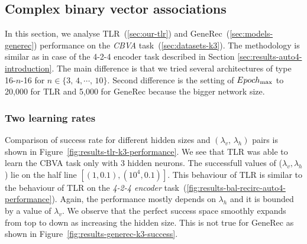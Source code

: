 

\subsection{Complex binary vector associations} 
\label{sec:results-k3}

In this section, we analyse TLR~(\ref{sec:our-tlr}) and GeneRec~(\ref{sec:models-generec}) performance on the \emph{CBVA} task~(\ref{sec:datasets-k3}). The methodology is similar as in case of the 4-2-4 encoder task described in Section \ref{sec:results-auto4-introduction}. The main difference is that we tried several architectures of type 16-$n$-16 for $n \in \{3,\,4,\cdots,\,10\}$. Second difference is the setting of $Epoch_{\rm max}$ to 20,000 for TLR and 5,000 for GeneRec because the bigger network size. 

\subsubsection{Two learning rates} 
\label{sec:tlr-k3}

Comparison of success rate for different hidden sizes and $(\lambda_v,\,\lambda_h)$ pairs is shown in Figure~\ref{fig:results-tlr-k3-performance}. We see that TLR was able to learn the CBVA task only with 3 hidden neurons. The successfull values of ($\lambda_v, \lambda_h$) lie on the half line $[(1, 0.1), (10^4, 0.1)]$. This behaviour of TLR is similar to the behaviour of TLR on the \emph{4-2-4 encoder} task~(\ref{fig:results-bal-recirc-auto4-performance}). Again, the performance mostly depends on $\lambda_h$ and it is bounded by a value of $\lambda_v$. We observe that the perfect success space smoothly expands from top to down as increasing the hidden size. This is not true for GeneRec as shown in Figure~\ref{fig:results-generec-k3-success}. 


